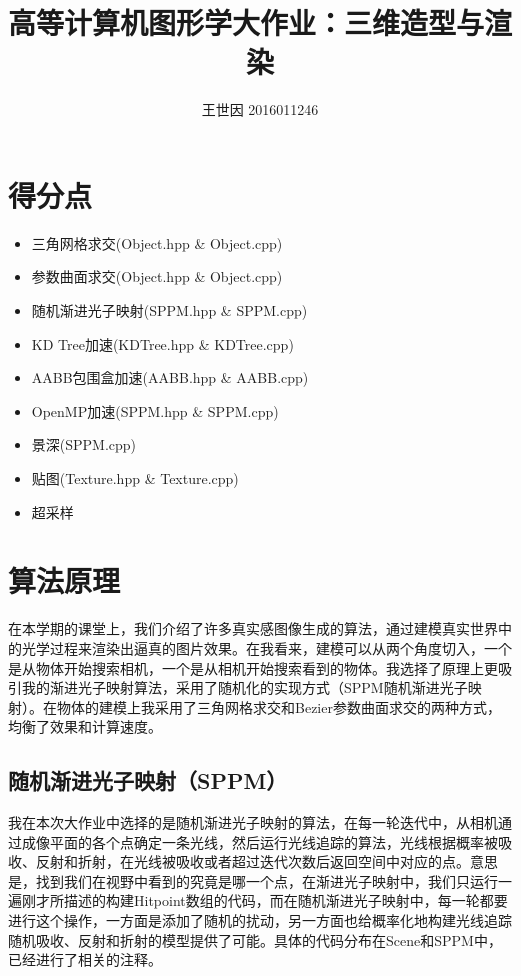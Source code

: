 \documentclass{article}
\title{高等计算机图形学大作业：三维造型与渲染}
\author{王世因 2016011246}
\date{}
\begin{document}
\maketitle

\tableofcontents
\newpage


\section{得分点}

\begin{itemize}
\item 三角网格求交(Object.hpp \& Object.cpp)
\item 参数曲面求交(Object.hpp \& Object.cpp)
\item 随机渐进光子映射(SPPM.hpp \& SPPM.cpp)
\item KD Tree加速(KDTree.hpp \& KDTree.cpp)
\item AABB包围盒加速(AABB.hpp \& AABB.cpp)
\item OpenMP加速(SPPM.hpp \& SPPM.cpp)
\item 景深(SPPM.cpp)
\item 贴图(Texture.hpp \& Texture.cpp)
\item 超采样
\end{itemize}

\section{算法原理}

在本学期的课堂上，我们介绍了许多真实感图像生成的算法，通过建模真实世界中的光学过程来渲染出逼真的图片效果。在我看来，建模可以从两个角度切入，一个是从物体开始搜索相机，一个是从相机开始搜索看到的物体。我选择了原理上更吸引我的渐进光子映射算法，采用了随机化的实现方式（SPPM随机渐进光子映射）。在物体的建模上我采用了三角网格求交和Bezier参数曲面求交的两种方式，均衡了效果和计算速度。

\subsection{随机渐进光子映射（SPPM）}

我在本次大作业中选择的是随机渐进光子映射的算法，在每一轮迭代中，从相机通过成像平面的各个点确定一条光线，然后运行光线追踪的算法，光线根据概率被吸收、反射和折射，在光线被吸收或者超过迭代次数后返回空间中对应的点。意思是，找到我们在视野中看到的究竟是哪一个点，在渐进光子映射中，我们只运行一遍刚才所描述的构建Hitpoint数组的代码，而在随机渐进光子映射中，每一轮都要进行这个操作，一方面是添加了随机的扰动，另一方面也给概率化地构建光线追踪随机吸收、反射和折射的模型提供了可能。具体的代码分布在Scene和SPPM中，已经进行了相关的注释。
\end{document}
